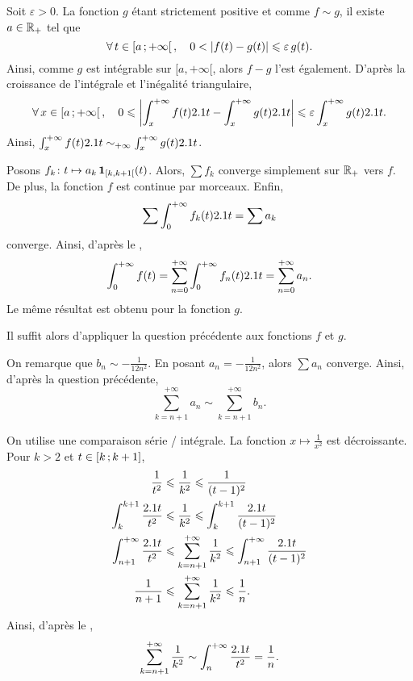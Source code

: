 \begin{elemdemo}
\begin{reponses}
\item Soit $\varepsilon > 0$. La fonction $g$ étant strictement positive et comme $f \sim g$, il existe $a \in \Rp$ tel que
\[
\forall t \in \interfo{a}{+\infty},\quad 0 < \abs{f(t) - g(t)} \leqslant \varepsilon \, g(t).
\]
Ainsi, comme $g$ est intégrable sur $[a, +\infty[$, alors $f - g$ l'est également. D'après la croissance de l'intégrale et l'inégalité triangulaire,
\[
\forall x \in \interfo{a}{+\infty},\quad 0 \leqslant \abs{\int_x^{+\infty} f(t) \d t - \int_x^{+\infty} g(t) \d t} \leqslant \varepsilon \int_x^{+\infty} g(t) \d t.
\]
Ainsi, $\int_x^{+\infty} f(t) \d t \sim_{+\infty} \int_x^{+\infty} g(t) \d t$.

\item Posons $\fonctionligne[f_k]{t}{a_k \, \indicatrice{[k,k+1[}(t)}$. Alors, $\sum f_k$ converge simplement sur $\Rp$ vers $f$. De plus, la fonction $f$ est continue par morceaux. Enfin,
\[
\sum \int_0^{+\infty} f_k(t) \d t = \sum a_k
\]
converge. Ainsi, d'après le ,
\[
\int_0^{+\infty} f(t)
= \sum_{n=0}^{+\infty} \int_0^{+\infty} f_n(t) \d t
= \sum_{n=0}^{+\infty} a_n.
\]
Le même résultat est obtenu pour la fonction $g$.

Il suffit alors d'appliquer la question précédente aux fonctions $f$ et $g$.

\item On remarque que $b_n \sim -\frac{1}{12 n^2}$. En posant $a_n = -\frac{1}{12 n^2}$, alors $\sum a_n$ converge. Ainsi, d'après la question précédente,
\[
\sum_{k=n+1}^{+\infty} a_n \sim \sum_{k=n+1}^{+\infty} b_n.
\]

\item On utilise une comparaison série / intégrale. La fonction $x \mapsto \frac{1}{x^2}$ est décroissante. Pour $k > 2$ et $t \in \interff{k}{k + 1}$,
\begin{align*}
\frac{1}{t^2} &\leqslant \frac{1}{k^2} \leqslant \frac{1}{(t - 1)^2}\\
\int_k^{k+1} \frac{\d t}{t^2} &\leqslant \frac{1}{k^2} \leqslant \int_k^{k+1} \frac{\d t}{(t - 1)^2}\\
\int_{n+1}^{+\infty} \frac{\d t}{t^2} &\leqslant \sum_{k=n+1}^{+\infty} \frac{1}{k^2} \leqslant \int_{n+1}^{+\infty} \frac{\d t}{(t - 1)^2}\\
\frac{1}{n + 1} &\leqslant \sum_{k=n+1}^{+\infty} \frac{1}{k^2} \leqslant \frac{1}{n}.
\end{align*}
Ainsi, d'après le ,
\[
\sum_{k=n+1}^{+\infty} \frac{1}{k^2} \sim \int_n^{+\infty} \frac{\d t}{t^2} = \frac{1}{n}.
\]


\end{reponses}
\end{elemdemo}
